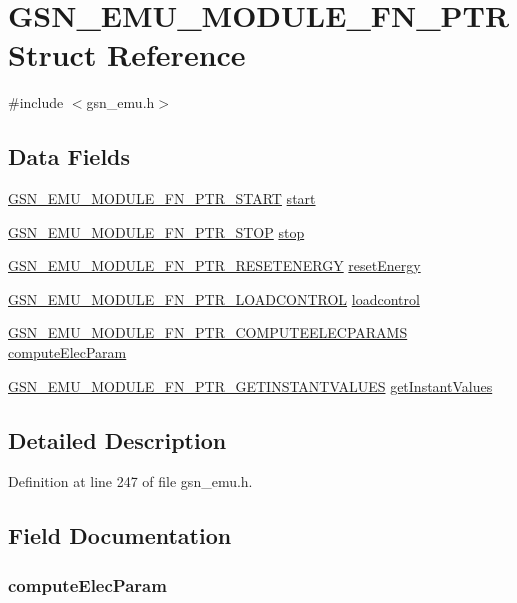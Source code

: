 \hypertarget{a00061}{
\section{GSN\_\-EMU\_\-MODULE\_\-FN\_\-PTR Struct Reference}
\label{a00061}
}


{\ttfamily \#include $<$gsn\_\-emu.h$>$}

\subsection*{Data Fields}
\begin{DoxyCompactItemize}
\item 
\hyperlink{a00490_ab5cebba523e2b72d76d138a05442f45f}{GSN\_\-EMU\_\-MODULE\_\-FN\_\-PTR\_\-START} \hyperlink{a00061_a8994897afe8fcae6439b505396d67bd7}{start}
\item 
\hyperlink{a00490_a4f4448985a9e37498dc826597d03c746}{GSN\_\-EMU\_\-MODULE\_\-FN\_\-PTR\_\-STOP} \hyperlink{a00061_a4ee10240be1d2d5d728c10050bb91287}{stop}
\item 
\hyperlink{a00490_a343265e26c41f9b84c1c91d6d0006343}{GSN\_\-EMU\_\-MODULE\_\-FN\_\-PTR\_\-RESETENERGY} \hyperlink{a00061_ab35710f3a87fd2f2ea8ad08d9199adec}{resetEnergy}
\item 
\hyperlink{a00490_a34475255b9c6517a46adea1b1cbca0bb}{GSN\_\-EMU\_\-MODULE\_\-FN\_\-PTR\_\-LOADCONTROL} \hyperlink{a00061_aa0222b0cde96fd824a42c5c3970e98c5}{loadcontrol}
\item 
\hyperlink{a00490_a38e48b9c517ca66deb9c18654d14c2e6}{GSN\_\-EMU\_\-MODULE\_\-FN\_\-PTR\_\-COMPUTEELECPARAMS} \hyperlink{a00061_a7a12e573135f3ce2755cdd4dd8df838f}{computeElecParam}
\item 
\hyperlink{a00490_aeb874e23d573a069ae569c2383444288}{GSN\_\-EMU\_\-MODULE\_\-FN\_\-PTR\_\-GETINSTANTVALUES} \hyperlink{a00061_ac6c6098e5980c35c3b1db23e668a6c67}{getInstantValues}
\end{DoxyCompactItemize}


\subsection{Detailed Description}


Definition at line 247 of file gsn\_\-emu.h.



\subsection{Field Documentation}
\hypertarget{a00061_a7a12e573135f3ce2755cdd4dd8df838f}{
\subsubsection[{computeElecParam}]{ {\bf computeElecParam}}}
\label{a00061_a7a12e573135f3ce2755cdd4dd8df838f}


